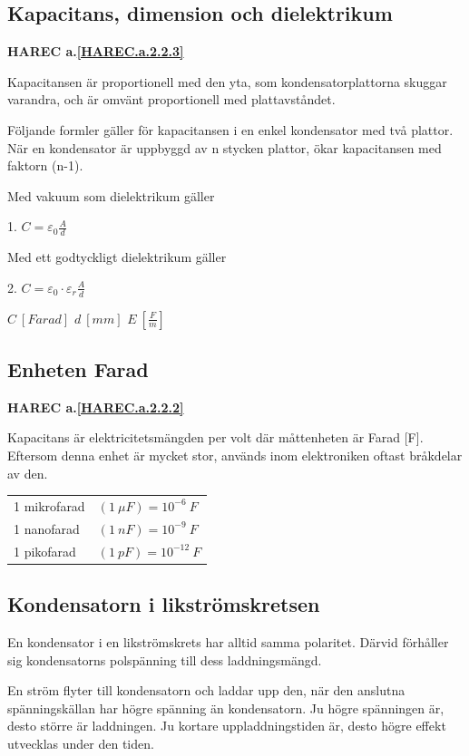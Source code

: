 \subsection{Kapacitans, dimension och dielektrikum}
\textbf{HAREC a.\ref{HAREC.a.2.2.3}\label{myHAREC.a.2.2.3}}

Kapacitansen är proportionell med den yta, som kondensatorplattorna skuggar
varandra, och är omvänt proportionell med plattavståndet.

Följande formler gäller för kapacitansen i en enkel kondensator med två
plattor. När en kondensator är uppbyggd av n stycken plattor, ökar kapacitansen
med faktorn (n-1).

Med vakuum som dielektrikum gäller

1. \(C = \varepsilon _0 \frac{A}{d}\)

Med ett godtyckligt dielektrikum gäller

2. \(C = \varepsilon _0 \cdot \varepsilon _r \frac{A}{d}\)

\(C\ [Farad]\) \(d\ [mm]\) \(E\ [\frac{F}{m}]\)

\subsection{Enheten Farad}
\textbf{HAREC a.\ref{HAREC.a.2.2.2}\label{myHAREC.a.2.2.2}}

Kapacitans är elektricitetsmängden per volt där måttenheten är Farad [F].
Eftersom denna enhet är mycket stor, används inom elektroniken oftast bråkdelar
av den.

\begin{tabular}{ll}
1 mikrofarad & \((1\ \mu F) = 10^{-6}\ F\) \\
1 nanofarad & \((1\ nF) = 10^{-9}\ F\) \\
1 pikofarad & \((1\ pF) = 10^{-12}\ F\) \\
\end{tabular}

\subsection{Kondensatorn i likströmskretsen}

En kondensator i en likströmskrets har alltid samma polaritet. Därvid förhåller
sig kondensatorns polspänning till dess laddningsmängd.

En ström flyter till kondensatorn och laddar upp den, när den anslutna
spänningskällan har högre spänning än kondensatorn. Ju högre spänningen är,
desto större är laddningen. Ju kortare uppladdningstiden är, desto högre effekt
utvecklas under den tiden.

